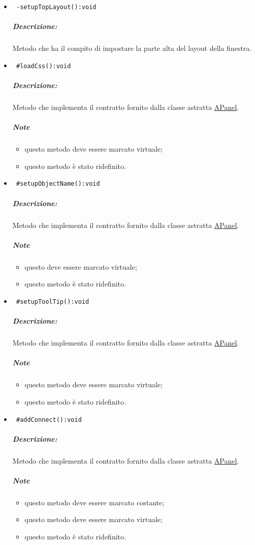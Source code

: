 \begin{itemize}
\item\color{blue}\verb! -setupTopLayout():void!
\color{black}
\subparagraph{Descrizione:} Metodo che ha il compito di impostare la parte alta del layout della finestra.
  
\item\color{blue}\verb! #loadCss():void!
\color{black}
\subparagraph{Descrizione:} Metodo che implementa il contratto fornito dalla classe astratta \hyperref[spe]{APanel}.
 \subparagraph{Note}
 \begin{itemize}
  \item questo metodo deve essere marcato virtuale;
 \item questo metodo è stato ridefinito.
 \end{itemize}
 
\item\color{blue}\verb! #setupObjectName():void!
\color{black}
\subparagraph{Descrizione:} Metodo che implementa il contratto fornito dalla classe astratta \hyperref[speAPanel]{APanel}.
 \subparagraph{Note}
 \begin{itemize}
  \item questo deve essere marcato virtuale;
 \item questo metodo è stato ridefinito.
 \end{itemize}
 
\item\color{blue}\verb! #setupToolTip():void!
\color{black}
\subparagraph{Descrizione:} Metodo che implementa il contratto fornito dalla classe astratta \hyperref[speAPanel]{APanel}.
 \subparagraph{Note}
 \begin{itemize}
 \item questo metodo deve essere marcato virtuale;
 \item questo metodo è stato ridefinito.
 \end{itemize}
 
\item\color{blue}\verb! #addConnect():void!
\color{black}
\subparagraph{Descrizione:} Metodo che implementa il contratto fornito dalla classe astratta \hyperref[speAPanel]{APanel}.
 \subparagraph{Note}
 \begin{itemize}
 \item questo metodo deve essere marcato costante;
 \item questo metodo deve essere marcato virtuale;
 \item questo metodo è stato ridefinito.
 \end{itemize}
 

\end{itemize}
